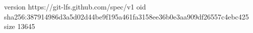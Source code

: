 version https://git-lfs.github.com/spec/v1
oid sha256:387914986d3a5d02d44be9f195a461fa3158ee36b0e3aa909df26557c4ebc425
size 13645
